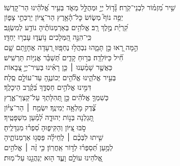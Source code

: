 \documentclass[twoside, openany, parskip=half, 11pt]{book}
\begin{document}
\\
\vspace{-1.5\baselineskip}
%
\begin{narrow}
שִׁ֥יר מִ֝זְמ֗וֹר לִבְנֵי־קֹֽרַח׃ \hfill \break
 גָּ֘ד֤וֹל יְיָ֣ וּמְהֻלָּ֣ל מְאֹ֑ד \hfill בְּעִ֥יר אֱ֝לֹהֵ֗ינוּ הַר־קׇדְשֽׁוֹ׃ \\
 יְפֵ֥ה נוֹף֮ מְשׂ֢וֹשׂ כׇּל־הָ֫אָ֥רֶץ \hfill הַר־צִ֭יּוֹן יַרְכְּתֵ֣י צָפ֑וֹן \\ קִ֝רְיַ֗ת מֶ֣לֶךְ רָֽב׃ \hfill
 אֱלֹהִ֥ים בְּאַרְמְנוֹתֶ֗יהָ נוֹדַ֥ע לְמִשְׂגָּֽב׃ \\
 כִּֽי־הִנֵּ֣ה הַ֭מְּלָכִים נ֥וֹעֲד֑וּ \hfill עָבְר֥וּ יַחְדָּֽו׃ \\
 הֵ֣מָּה רָ֭אוּ כֵּ֣ן תָּמָ֑הוּ נִבְהֲל֥וּ נֶחְפָּֽזוּ׃ \hfill
 רְ֭עָדָה אֲחָזָ֣תַם שָׁ֑ם \\ חִ֗֝יל כַּיּוֹלֵדָֽה׃ \hfill
 בְּר֥וּחַ קָדִ֑ים תְּ֝שַׁבֵּ֗ר אֳנִיּ֥וֹת תַּרְשִֽׁישׁ׃ \\
 כַּאֲשֶׁ֤ר שָׁמַ֨עְנוּ ׀ כֵּ֤ן רָאִ֗ינוּ \hfill בְּעִיר־יְיָ֣ צְ֭בָאוֹת \\ בְּעִ֣יר אֱלֹהֵ֑ינוּ \hfill אֱלֹ֘הִ֤ים יְכוֹנְנֶ֖הָ עַד־עוֹלָ֣ם סֶֽלָה׃ \\
 דִּמִּ֣ינוּ אֱלֹהִ֣ים חַסְדֶּ֑ךָ \hfill בְּ֝קֶ֗רֶב הֵיכָלֶֽךָ׃ \\
כְּשִׁמְךָ֤ אֱלֹהִ֗ים \hfill כֵּ֣ן תְּ֭הִלָּתְךָ עַל־קַצְוֵי־אֶ֑רֶץ \\ צֶ֗֝דֶק מָלְאָ֥ה יְמִינֶֽךָ׃ \hfill
 יִשְׂמַ֤ח ׀ הַר־צִיּ֗וֹן \\ תָּ֭גֵלְנָה בְּנ֣וֹת יְהוּדָ֑ה \hfill לְ֝מַ֗עַן מִשְׁפָּטֶֽיךָ׃ \\
 סֹ֣בּוּ צִ֭יּוֹן וְהַקִּיפ֑וּהָ \hfill סִ֝פְר֗וּ מִגְדָּלֶֽיהָ׃ \\
 שִׁ֤יתוּ לִבְּכֶ֨ם ׀ לְֽחֵילָ֗ה \hfill פַּסְּג֥וּ אַרְמְנוֹתֶ֑יהָ \\ לְמַ֥עַן תְּ֝סַפְּר֗וּ לְד֣וֹר אַֽחֲרֽוֹן׃ \hfill
 כִּ֤י זֶ֨ה ׀ אֱלֹהִ֣ים \\ אֱ֭לֹהֵינוּ עוֹלָ֣ם \hfill וָעֶ֑ד ה֖וּא יְנַהֲגֵ֣נוּ עַל־מֽוּת׃ 
\end{narrow}

\enlargethispage{\baselineskip}
\end{document}
